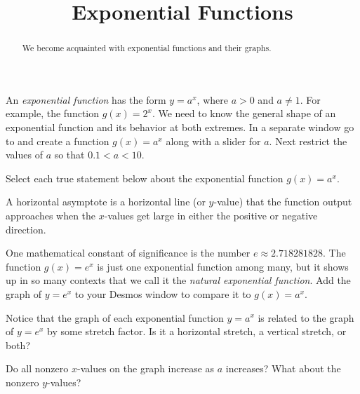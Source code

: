 \documentclass{ximera}
\title{Exponential Functions}
\begin{document}
\begin{abstract}
We become acquainted with exponential functions and their graphs.
\end{abstract}
\maketitle


An \emph{exponential function} has the form $y=a^x$, where $a>0$ and $a\ne1$. For example, the function $g(x)=2^x$. We need to know the general shape of an exponential function and its behavior at both extremes. In a separate window go to  and create a function $g(x)=a^x$ along with a slider for $a$. Next restrict the values of $a$ so that $0.1<a<10$.

\begin{question}
Select each true statement below about the exponential function $g(x)=a^x$.

    \begin{multipleChoice}
    \end{multipleChoice}
    \begin{hint}
      A horizontal asymptote is a horizontal line (or $y$-value) that the function output approaches when the $x$-values get large in either the positive or negative direction.
    \end{hint}

\end{question}


One mathematical constant of significance is the number $e\approx2.718281828$. The function $g(x)=e^x$ is just one exponential function among many, but it shows up in so many contexts that we call it the \emph{natural exponential function}. Add the graph of $y=e^x$ to your Desmos window to compare it to $g(x)=a^x$.

\begin{question}
Notice that the graph of each exponential function $y=a^x$ is related to the graph of $y=e^x$ by some stretch factor. Is it a horizontal stretch, a vertical stretch, or both? 

    \begin{multipleChoice}
    \end{multipleChoice}
    \begin{hint}
      Do all nonzero $x$-values on the graph increase as $a$ increases? What about the nonzero $y$-values?
    \end{hint}

\end{question}
\end{document}
